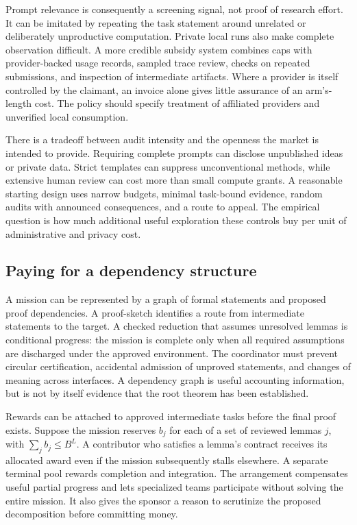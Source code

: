 \documentclass[11pt,a4paper]{article}
\begin{document}
Prompt relevance is consequently a screening signal, not proof of research effort. It can be imitated by repeating the task statement around unrelated or deliberately unproductive computation. Private local runs also make complete observation difficult. A more credible subsidy system combines caps with provider-backed usage records, sampled trace review, checks on repeated submissions, and inspection of intermediate artifacts. Where a provider is itself controlled by the claimant, an invoice alone gives little assurance of an arm's-length cost. The policy should specify treatment of affiliated providers and unverified local consumption.

There is a tradeoff between audit intensity and the openness the market is intended to provide. Requiring complete prompts can disclose unpublished ideas or private data. Strict templates can suppress unconventional methods, while extensive human review can cost more than small compute grants. A reasonable starting design uses narrow budgets, minimal task-bound evidence, random audits with announced consequences, and a route to appeal. The empirical question is how much additional useful exploration these controls buy per unit of administrative and privacy cost.

\subsection{Paying for a dependency structure}
A mission can be represented by a graph of formal statements and proposed proof dependencies. A proof-sketch identifies a route from intermediate statements to the target. A checked reduction that assumes unresolved lemmas is conditional progress: the mission is complete only when all required assumptions are discharged under the approved environment. The coordinator must prevent circular certification, accidental admission of unproved statements, and changes of meaning across interfaces. A dependency graph is useful accounting information, but is not by itself evidence that the root theorem has been established.

Rewards can be attached to approved intermediate tasks before the final proof exists. Suppose the mission reserves $b_j$ for each of a set of reviewed lemmas $j$, with $\sum_j b_j\leq B^L$. A contributor who satisfies a lemma's contract receives its allocated award even if the mission subsequently stalls elsewhere. A separate terminal pool rewards completion and integration. The arrangement compensates useful partial progress and lets specialized teams participate without solving the entire mission. It also gives the sponsor a reason to scrutinize the proposed decomposition before committing money.
\end{document}
